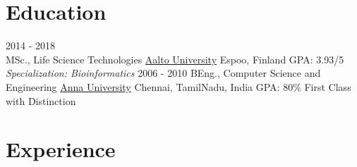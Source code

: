 \documentclass[letterpaper]{twentysecondcv} %
\begin{document}
\makeprofile %

\section{Education}

\begin{twenty} %
	\twentyitem
	{2014 - 2018 \\}
	{MSc., Life Science Technologies}
	{\href{http://www.aalto.fi/}{Aalto University}}
	{Espoo, Finland}
	{GPA: 3.93/5 \\ \textit{Specialization: Bioinformatics}}
	\twentyitem
	{2006 - 2010}
	{BEng., Computer Science and Engineering}
	{\href{https://www.annauniv.edu/}{Anna University}}
	{Chennai, TamilNadu, India}
	{GPA: 80\% First Class with Distinction}
\end{twenty}




\section{Experience}
\end{document}
